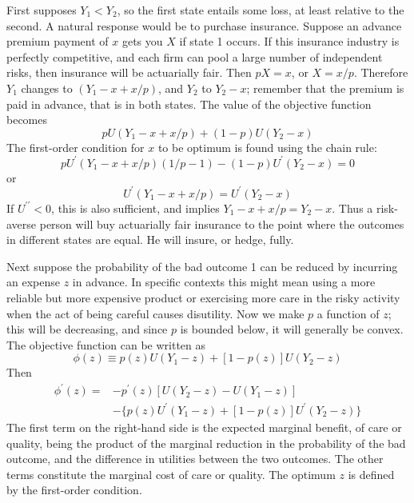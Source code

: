 First supposes $Y_1 < Y_2$, so the first state entails some loss, at least relative to the second. A natural response would be to purchase insurance. Suppose an advance premium payment of $x$ gets you $X$ if state 1 occurs. If this insurance industry is perfectly competitive, and each firm can pool a large number of independent risks, then insurance will be actuarially fair. Then $pX=x$, or $X=x/p$. Therefore $Y_1$ changes to $(Y_1 -x + x/p)$, and $Y_2$ to $Y_2 -x$; remember that the premium is paid in advance, that is in both states. The value of the objective function becomes
\begin{equation*}
p U(Y_1 -x + x/p) + (1-p) U(Y_2 -x)
\end{equation*}
The first-order condition for $x$ to be optimum is found using the chain rule:
\begin{equation*}
p U^\prime (Y_1 -x + x/p)(1/p - 1) - (1-p) U^\prime (Y_2 -x) =0
\end{equation*}
or
\begin{equation*}
 U^\prime (Y_1 -x + x/p) =  U^\prime (Y_2 -x)
\end{equation*}
If $U^{\prime \prime} <0$, this is also sufficient, and implies $Y_1 -x +x/p = Y_2 -x$. Thus a risk-averse person will buy actuarially fair insurance to the point where the outcomes in different states are equal. He will insure, or hedge, fully.

Next suppose the probability of the bad outcome 1 can be reduced by incurring an expense $z$ in advance. In specific contexts this might mean using a more reliable but more expensive product or exercising more care in the risky activity when the act of being careful causes disutility. Now we make $p$ a function of $z$; this will be decreasing, and since $p$ is bounded below, it will generally be convex. The objective function can be written as
\begin{equation*}
 \phi (z) \equiv p(z) U(Y_1 -z) + [1-p(z)] U(Y_2 -z)
\end{equation*}
Then 
\begin{equation} \label{equa9.3}
\begin{array}{rl}
\phi^\prime (z) =& -p^\prime(z) [ U(Y_2 -z) -  U(Y_1 -z)  ]  \\
&- \{ p(z)U^\prime (Y_1 -z) + [1-p(z)] U^\prime(Y_2 -z)  \}
\end{array}
\end{equation}
The first term on the right-hand side is the expected marginal benefit, of care or quality, being the product of the marginal reduction in the probability of the bad outcome, and the difference in utilities between the two outcomes. The other terms constitute the marginal cost of care or quality. The optimum $z$ is defined by the first-order condition.

